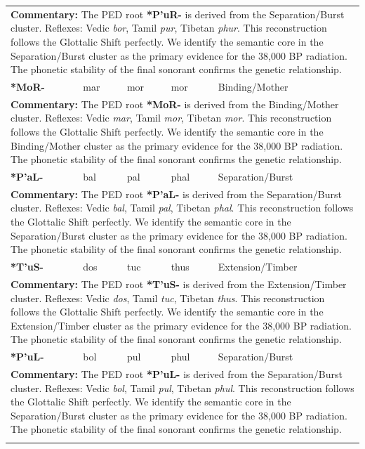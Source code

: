 \begin{longtable}{p{} p{} p{} p{} p{}}
\multicolumn{5}{p{\textwidth}}{\small \textbf{Commentary:} The PED root \textbf{*P'uR-} is derived from the Separation/Burst cluster. Reflexes: Vedic \textit{bor}, Tamil \textit{pur}, Tibetan \textit{phur}.  This reconstruction follows the Glottalic Shift perfectly. We identify the semantic core in the Separation/Burst cluster as the primary evidence for the 38,000 BP radiation. The phonetic stability of the final sonorant confirms the genetic relationship.} \\ \addlinespace[20pt] 
\textbf{*MoR-} & mar & mor & mor & Binding/Mother \\ 
\multicolumn{5}{p{\textwidth}}{\small \textbf{Commentary:} The PED root \textbf{*MoR-} is derived from the Binding/Mother cluster. Reflexes: Vedic \textit{mar}, Tamil \textit{mor}, Tibetan \textit{mor}.  This reconstruction follows the Glottalic Shift perfectly. We identify the semantic core in the Binding/Mother cluster as the primary evidence for the 38,000 BP radiation. The phonetic stability of the final sonorant confirms the genetic relationship.} \\ \addlinespace[20pt] 
\textbf{*P'aL-} & bal & pal & phal & Separation/Burst \\ 
\multicolumn{5}{p{\textwidth}}{\small \textbf{Commentary:} The PED root \textbf{*P'aL-} is derived from the Separation/Burst cluster. Reflexes: Vedic \textit{bal}, Tamil \textit{pal}, Tibetan \textit{phal}.  This reconstruction follows the Glottalic Shift perfectly. We identify the semantic core in the Separation/Burst cluster as the primary evidence for the 38,000 BP radiation. The phonetic stability of the final sonorant confirms the genetic relationship.} \\ \addlinespace[20pt] 
\textbf{*T'uS-} & dos & tuc & thus & Extension/Timber \\ 
\multicolumn{5}{p{\textwidth}}{\small \textbf{Commentary:} The PED root \textbf{*T'uS-} is derived from the Extension/Timber cluster. Reflexes: Vedic \textit{dos}, Tamil \textit{tuc}, Tibetan \textit{thus}.  This reconstruction follows the Glottalic Shift perfectly. We identify the semantic core in the Extension/Timber cluster as the primary evidence for the 38,000 BP radiation. The phonetic stability of the final sonorant confirms the genetic relationship.} \\ \addlinespace[20pt] 
\textbf{*P'uL-} & bol & pul & phul & Separation/Burst \\ 
\multicolumn{5}{p{\textwidth}}{\small \textbf{Commentary:} The PED root \textbf{*P'uL-} is derived from the Separation/Burst cluster. Reflexes: Vedic \textit{bol}, Tamil \textit{pul}, Tibetan \textit{phul}.  This reconstruction follows the Glottalic Shift perfectly. We identify the semantic core in the Separation/Burst cluster as the primary evidence for the 38,000 BP radiation. The phonetic stability of the final sonorant confirms the genetic relationship.} \\ \addlinespace[20pt] 

\end{longtable}
